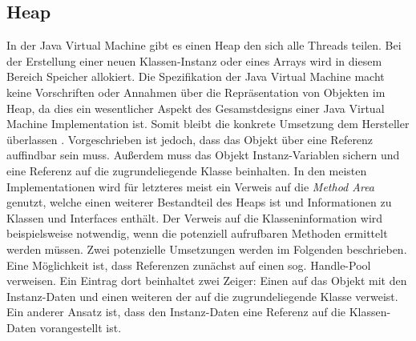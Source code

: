 \documentclass[conference]{IEEEtran}
\begin{document}
\subsection{Heap}
\label{chHeap}
In der Java Virtual Machine gibt es einen Heap den sich alle Threads teilen. Bei der Erstellung einer neuen Klassen-Instanz oder eines Arrays wird in diesem Bereich Speicher allokiert. Die Spezifikation der Java Virtual Machine macht keine Vorschriften oder Annahmen über die Repräsentation von Objekten im Heap, da dies ein wesentlicher Aspekt des Gesamstdesigns einer Java Virtual Machine Implementation ist. Somit bleibt die konkrete Umsetzung dem Hersteller überlassen \cite{Lindholm.21.08.2018}. Vorgeschrieben ist jedoch, dass das Objekt über eine Referenz auffindbar sein muss. Außerdem muss das Objekt Instanz-Variablen sichern und eine Referenz auf die zugrundeliegende Klasse beinhalten. In den meisten Implementationen wird für letzteres meist ein Verweis auf die \textit{Method Area} genutzt, welche einen weiterer Bestandteil des Heaps ist und Informationen zu Klassen und Interfaces enthält. Der Verweis auf die Klasseninformation wird beispielsweise notwendig, wenn die potenziell aufrufbaren Methoden ermittelt werden müssen. Zwei potenzielle Umsetzungen werden im Folgenden beschrieben. Eine Möglichkeit ist, dass Referenzen zunächst auf einen sog. Handle-Pool verweisen. Ein Eintrag dort beinhaltet zwei Zeiger: Einen auf das Objekt mit den Instanz-Daten und einen weiteren der auf die zugrundeliegende Klasse verweist. Ein anderer Ansatz ist, dass den Instanz-Daten eine Referenz auf die Klassen-Daten vorangestellt ist.
\end{document}
